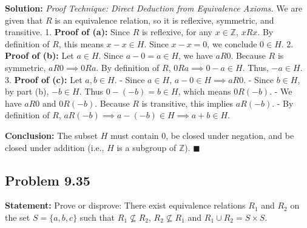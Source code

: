 \documentclass[11pt, a4paper]{article}
\theoremstyle{definition}
\theoremstyle{remark}
\newcommand{\Z}{\mathbb{Z}}
\begin{document}
\textbf{Solution:}
\textit{Proof Technique: Direct Deduction from Equivalence Axioms.}
We are given that $R$ is an equivalence relation, so it is reflexive, symmetric, and transitive.
1. \textbf{Proof of (a):} Since $R$ is reflexive, for any $x \in \Z$, $x R x$. By definition of $R$, this means $x - x \in H$. Since $x - x = 0$, we conclude $0 \in H$.
2. \textbf{Proof of (b):} Let $a \in H$. Since $a - 0 = a \in H$, we have $a R 0$. Because $R$ is symmetric, $a R 0 \implies 0 R a$. By definition of $R$, $0 R a \implies 0 - a \in H$. Thus, $-a \in H$.
3. \textbf{Proof of (c):} Let $a, b \in H$. 
   - Since $a \in H$, $a - 0 \in H \implies a R 0$.
   - Since $b \in H$, by part (b), $-b \in H$. Thus $0 - (-b) = b \in H$, which means $0 R (-b)$.
   - We have $a R 0$ and $0 R (-b)$. Because $R$ is transitive, this implies $a R (-b)$.
   - By definition of $R$, $a R (-b) \implies a - (-b) \in H \implies a + b \in H$.

\textbf{Conclusion:} The subset $H$ must contain 0, be closed under negation, and be closed under addition (i.e., $H$ is a subgroup of $\Z$). $\blacksquare$

\subsection{Problem 9.35}
\textbf{Statement:} Prove or disprove: There exist equivalence relations $R_1$ and $R_2$ on the set $S = \{a, b, c\}$ such that $R_1 \not\subseteq R_2$, $R_2 \not\subseteq R_1$ and $R_1 \cup R_2 = S \times S$.
\end{document}
